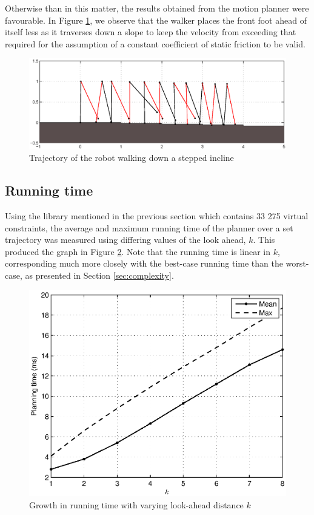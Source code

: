 Otherwise than in this matter, the results obtained from the motion planner were favourable. In Figure \ref{fig:slowdown}, we observe that the walker places the front foot ahead of itself less as it traverses down a slope to keep the velocity from exceeding that required for the assumption of a constant coefficient of static friction to be valid.

\begin{figure}
\centering
\includegraphics[width=\linewidth]{7Results/slowdown}
\caption{Trajectory of the robot walking down a stepped incline}
\label{fig:slowdown}
\end{figure}

\subsection{Running time}
Using the library mentioned in the previous section which contains 33 275 virtual constraints, the average and maximum running time of the planner over a set trajectory was measured using differing values of the look ahead, $k$. This produced the graph in Figure \ref{fig:lookahead}. Note that the running time is linear in $k$, corresponding much more closely with the best-case running time than the worst-case, as presented in Section \ref{sec:complexity}.

\begin{figure}
\centering
\includegraphics[width=0.6\linewidth]{7Results/lookahead}
\caption{Growth in running time with varying look-ahead distance $k$}
\label{fig:lookahead}
\end{figure}

